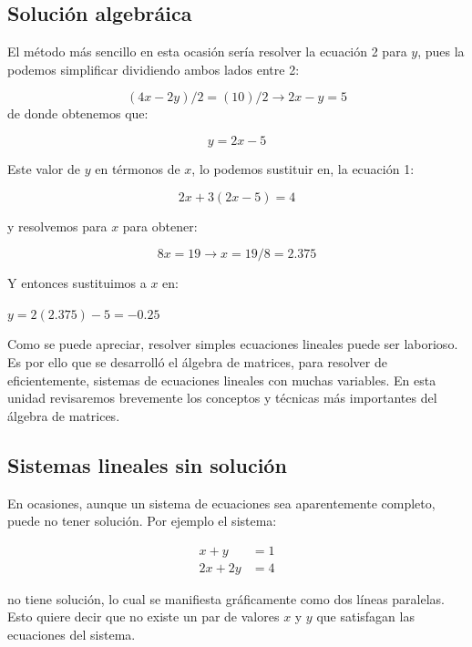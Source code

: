 \documentclass[
]{book}
\begin{document}
\hypertarget{soluciuxf3n-algebruxe1ica}{%
\subsection{Solución algebráica}\label{soluciuxf3n-algebruxe1ica}}

El método más sencillo en esta ocasión sería resolver la ecuación 2 para \(y\), pues la podemos simplificar dividiendo ambos lados entre 2:

\[ (4x - 2y)/2 = (10)/2 \rightarrow 2x - y = 5\]
de donde obtenemos que:

\[y = 2x-5\]

Este valor de \(y\) en térmonos de \(x\), lo podemos sustituir en, la ecuación 1:

\[2x+3(2x-5) = 4\]

y resolvemos para \(x\) para obtener:

\[8x = 19 \rightarrow x = 19/8=2.375\]

Y entonces sustituimos a \(x\) en:

\(y = 2(2.375) - 5 = -0.25\)

Como se puede apreciar, resolver simples ecuaciones lineales puede ser laborioso. Es por ello que se desarrolló el álgebra de matrices, para resolver de eficientemente, sistemas de ecuaciones lineales con muchas variables. En esta unidad revisaremos brevemente los conceptos y técnicas más importantes del álgebra de matrices.

\hypertarget{sistemas-lineales-sin-soluciuxf3n}{%
\subsection{Sistemas lineales sin solución}\label{sistemas-lineales-sin-soluciuxf3n}}

En ocasiones, aunque un sistema de ecuaciones sea aparentemente completo, puede no tener solución. Por ejemplo el sistema:

\begin{align}
x + y & = 1 \\
2x + 2y & = 4
\end{align}

no tiene solución, lo cual se manifiesta gráficamente como dos líneas paralelas. Esto quiere decir que no existe un par de valores \(x\) y \(y\) que satisfagan las ecuaciones del sistema.
\end{document}
